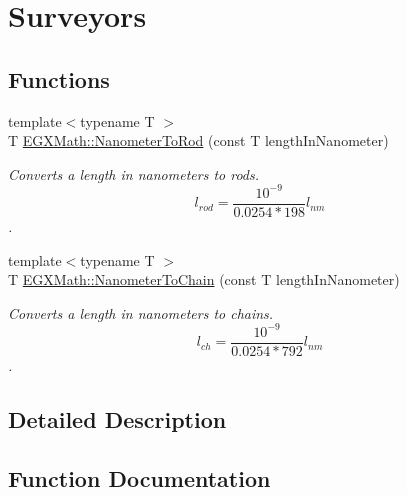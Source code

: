 \hypertarget{group___e_g_x_math-_conversions-_length_conversions-_nanometer-_surveyors}{}\section{Surveyors}
\label{group___e_g_x_math-_conversions-_length_conversions-_nanometer-_surveyors}
\subsection*{Functions}
\begin{DoxyCompactItemize}
\item 
{\footnotesize template$<$typename T $>$ }\\T \mbox{\hyperlink{group___e_g_x_math-_conversions-_length_conversions-_nanometer-_surveyors_ga4677e0e0b8662f3786f43cea2f76e8d9}{E\+G\+X\+Math\+::\+Nanometer\+To\+Rod}} (const T length\+In\+Nanometer)
\begin{DoxyCompactList}\small\item\em Converts a length in nanometers to rods. \[ l_{rod}= \frac{10^{-9}}{0.0254 * 198} l_{nm} \]. \end{DoxyCompactList}\item 
{\footnotesize template$<$typename T $>$ }\\T \mbox{\hyperlink{group___e_g_x_math-_conversions-_length_conversions-_nanometer-_surveyors_ga8da91a669cbde463135b21d48ffbdedc}{E\+G\+X\+Math\+::\+Nanometer\+To\+Chain}} (const T length\+In\+Nanometer)
\begin{DoxyCompactList}\small\item\em Converts a length in nanometers to chains. \[ l_{ch}= \frac{10^{-9}}{0.0254 * 792} l_{nm} \]. \end{DoxyCompactList}\end{DoxyCompactItemize}


\subsection{Detailed Description}


\subsection{Function Documentation}
\mbox{\label{group___e_g_x_math-_conversions-_length_conversions-_nanometer-_surveyors_ga8da91a669cbde463135b21d48ffbdedc}} 
